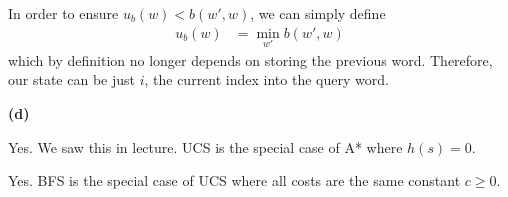 \documentclass[11pt]{article}
\begin{document}
In order to ensure $u_b(w) < b(w', w)$, we can simply define
\begin{align}
	u_b(w) &= \min_{w'} b(w', w)
\end{align}
which by definition no longer depends on storing the previous word. Therefore, our state can be just $i$, the current index into the query word. 





\clearpage
\textbf{(d)} 


Yes. We saw this in lecture. UCS is the special case of A* where $h(s) = 0$. 


Yes. BFS is the special case of UCS where all costs are the same constant $c \ge 0$. 
\end{document}
